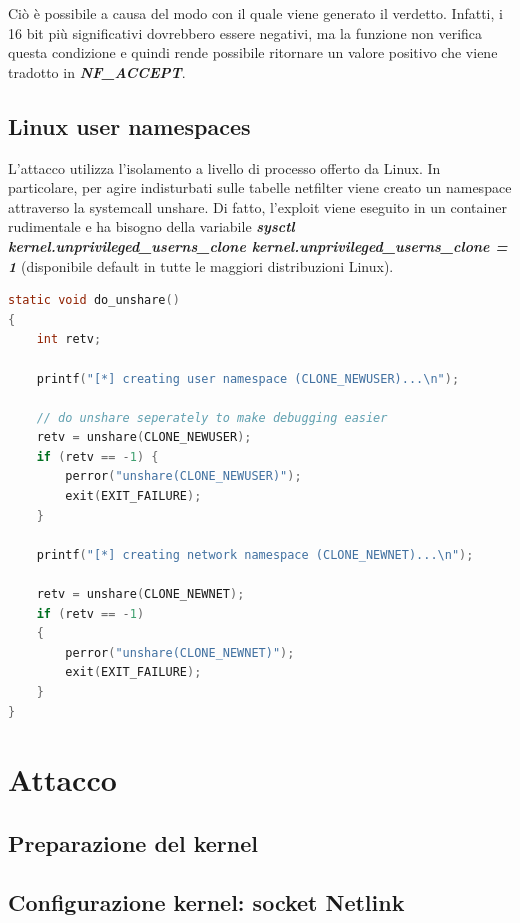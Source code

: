 \documentclass{article}
\begin{document}
Ciò è possibile a causa del modo con il quale viene generato il verdetto. Infatti, i 16 bit 
più significativi dovrebbero essere negativi, ma la funzione non verifica questa condizione 
e quindi rende possibile ritornare un valore positivo che viene tradotto in 
\textbf{\textit{NF\_ACCEPT}}.

\subsection{Linux user namespaces} 
L'attacco utilizza l'isolamento a livello di processo offerto da Linux. In particolare, 
per agire indisturbati sulle tabelle netfilter viene creato un namespace attraverso la 
systemcall unshare. Di fatto, l'exploit viene eseguito in un container rudimentale 
e ha bisogno della variabile \textbf{\textit{sysctl kernel.unprivileged\_userns\_clone
kernel.unprivileged\_userns\_clone = 1}} (disponibile default in tutte le maggiori 
distribuzioni Linux). 

\begin{lstlisting}[language=C,captio="Setup network namespace come utente non privilegiato"]
static void do_unshare()
{
    int retv;

    printf("[*] creating user namespace (CLONE_NEWUSER)...\n");
    
	// do unshare seperately to make debugging easier
    retv = unshare(CLONE_NEWUSER);
	if (retv == -1) {
        perror("unshare(CLONE_NEWUSER)");
        exit(EXIT_FAILURE);
    }

    printf("[*] creating network namespace (CLONE_NEWNET)...\n");

    retv = unshare(CLONE_NEWNET);
    if (retv == -1)
	{
		perror("unshare(CLONE_NEWNET)");
		exit(EXIT_FAILURE);
	}
}
\end{lstlisting}

\clearpage
\section{Attacco}

\subsection{Preparazione del kernel}

\subsection{Configurazione kernel: socket Netlink}
\end{document}
